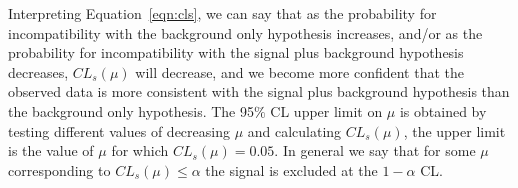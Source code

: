 \noindent Interpreting Equation~\ref{eqn:cls}, we can say that as the probability for incompatibility with the background only hypothesis increases, and/or as the probability
for incompatibility with the signal plus background hypothesis decreases, $CL_{s}(\mu)$ will decrease, and we become more confident that the observed data is more consistent with
the signal plus background hypothesis than the background only hypothesis. The 95$\%$ CL upper limit on $\mu$ is obtained by testing different values of decreasing $\mu$ and
calculating $CL_{s}(\mu)$, the upper limit is the value of $\mu$ for which $CL_{s}(\mu) = 0.05$. In general we say that for some $\mu$ corresponding to $CL_{s}(\mu) \leq \alpha$
the signal is excluded at the $1-\alpha$ CL. 







  






